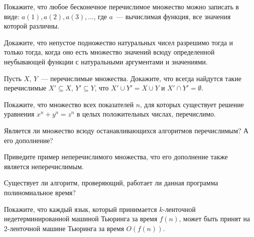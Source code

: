 \setcounter{curtask}{1}


\begin{task}
    Покажите, что любое бесконечное перечислимое множество можно записать в виде: ${a(1), a(2), a(3), \dots}$, где $a$~---
    вычислимая функция, все значения которой различны.
\end{task}

\begin{task}
    Докажите, что непустое подножество натуральных чисел разрешимо тогда и только тогда, когда оно есть множество значений всюду
    определенной неубывающей функции с натуральными аргументами и значениями.
\end{task}

\begin{task}
    Пусть $X$, $Y$~--- перечислимые множества. Докажите, что всегда найдутся такие перечислимые $X' \subseteq X$, $Y' \subseteq
    Y$, что $X' \cup Y' = X \cup Y$ и $X' \cap Y' = \emptyset$.
\end{task}

\begin{task}
    Покажите, что множество всех показателей $n$, для которых существует решение уравнения $x^n + y^n = z^n$ в целых положительных
    числах, перечислимо.
\end{task}

\begin{task}
    Является ли множество всюду останавливающихся алгоритмов перечислимым? А его дополнение?
\end{task}

\begin{task}
    Приведите пример неперечислимого множества, что его дополнение также является неперечислимым.
\end{task}

\begin{task}
    Существует ли алгоритм, проверяющий, работает ли данная программа полиномиальное время?
\end{task}

\begin{task}
    Покажите, что каждый язык, который принимается $k$-ленточной недетерминированной машиной Тьюринга за время $f(n)$, может быть
    принят на $2$-ленточной машине Тьюринга за время $O(f(n))$.
\end{task}